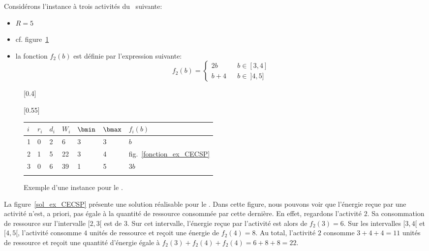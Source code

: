 \begin{ex}
Considérons l'instance à trois activités du \CECSP~suivante:
\begin{itemize}
\item $R=5$
\item cf. figure~\ref{ex_CECSP}
\item la fonction $f_2(b)$ est définie par l'expression suivante: 
\[f_2(b)=\left\{
\begin{array}{lll}
2b & & b \in [3,4]\\
b+4 & & b \in \ ]4,5]
\end{array}
\right.\]
\end{itemize}
\begin{figure}[!htb]
\centering
{}[0.4\linewidth]{
}
\hfill
{}[0.55\linewidth]{
  \begin{tabular}{|M{0.6cm}|M{0.6cm}M{0.6cm}M{0.6cm}M{0.6cm}M{0.6cm}M{1.2cm}|}
    \hline
    $i$ & $r_i$ & $d_i$ & $W_i$ & $\bmin$ & $\bmax$ & $f_i(b)$\\[2mm]
 & 0 & 2 & 6 & 3 & 3 & $b$\\[2mm]
    2 & 1 & 5 & 22 & 3 & 4 & fig.~\ref{fonction_ex_CECSP}\\[2mm]
    3 & 0 & 6 & 39 & 1 & 5 & $3b$\\[2mm]
    \hline
  \end{tabular}} 
\caption{Exemple d'une instance pour le \CECSP.}
\label{ex_CECSP}
\end{figure}
La figure~\ref{sol_ex_CECSP} présente une solution réalisable pour le
\CECSP. Dans cette figure, nous pouvons voir que l'énergie reçue par une
activité n'est, a priori, pas égale à la quantité de ressource
consommée par cette dernière. En effet, regardons l'activité $2$. Sa
consommation de ressource sur l'intervalle $[2,3[$ est de $3$. Sur
cet intervalle, l'énergie reçue par l'activité est alors de
$f_2(3)=6$. Sur les intervalles $[3,4[$ et $ [4,5[$, l'activité
consomme $4$ unités de ressource et reçoit une énergie de
$f_2(4)=8$. Au total, l'activité $2$ consomme $3 + 4 + 4 = 11$ unités
de ressource et reçoit une quantité d'énergie égale à $f_2(3)+ f_2(4)+
f_2(4)= 6 + 8 + 8 =22$. 


\end{ex}
